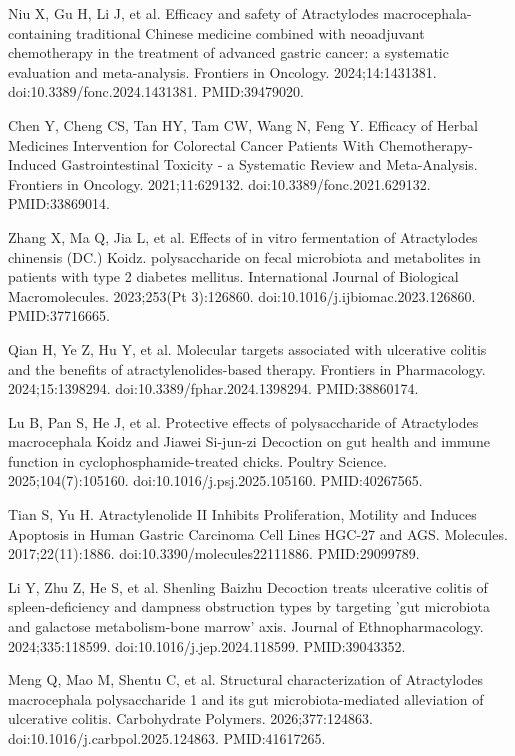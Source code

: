 \documentclass[12pt,oneside]{book}
\newcommand{\reff}[2]{\par\hangindent=7mm\hangafter=1\noindent[#1]\hspace{2mm}#2\par}
\begin{document}
\reff{39}{Niu X, Gu H, Li J, et al. Efficacy and safety of Atractylodes macrocephala-containing traditional Chinese medicine combined with neoadjuvant chemotherapy in the treatment of advanced gastric cancer: a systematic evaluation and meta-analysis. Frontiers in Oncology. 2024;14:1431381. doi:10.3389/fonc.2024.1431381. PMID:39479020.}

\reff{40}{Chen Y, Cheng CS, Tan HY, Tam CW, Wang N, Feng Y. Efficacy of Herbal Medicines Intervention for Colorectal Cancer Patients With Chemotherapy-Induced Gastrointestinal Toxicity - a Systematic Review and Meta-Analysis. Frontiers in Oncology. 2021;11:629132. doi:10.3389/fonc.2021.629132. PMID:33869014.}

\reff{41}{Zhang X, Ma Q, Jia L, et al. Effects of in vitro fermentation of Atractylodes chinensis (DC.) Koidz. polysaccharide on fecal microbiota and metabolites in patients with type 2 diabetes mellitus. International Journal of Biological Macromolecules. 2023;253(Pt 3):126860. doi:10.1016/j.ijbiomac.2023.126860. PMID:37716665.}

\reff{42}{Qian H, Ye Z, Hu Y, et al. Molecular targets associated with ulcerative colitis and the benefits of atractylenolides-based therapy. Frontiers in Pharmacology. 2024;15:1398294. doi:10.3389/fphar.2024.1398294. PMID:38860174.}

\reff{43}{Lu B, Pan S, He J, et al. Protective effects of polysaccharide of Atractylodes macrocephala Koidz and Jiawei Si-jun-zi Decoction on gut health and immune function in cyclophosphamide-treated chicks. Poultry Science. 2025;104(7):105160. doi:10.1016/j.psj.2025.105160. PMID:40267565.}

\reff{44}{Tian S, Yu H. Atractylenolide II Inhibits Proliferation, Motility and Induces Apoptosis in Human Gastric Carcinoma Cell Lines HGC-27 and AGS. Molecules. 2017;22(11):1886. doi:10.3390/molecules22111886. PMID:29099789.}

\reff{45}{Li Y, Zhu Z, He S, et al. Shenling Baizhu Decoction treats ulcerative colitis of spleen-deficiency and dampness obstruction types by targeting 'gut microbiota and galactose metabolism-bone marrow' axis. Journal of Ethnopharmacology. 2024;335:118599. doi:10.1016/j.jep.2024.118599. PMID:39043352.}

\reff{46}{Meng Q, Mao M, Shentu C, et al. Structural characterization of Atractylodes macrocephala polysaccharide 1 and its gut microbiota-mediated alleviation of ulcerative colitis. Carbohydrate Polymers. 2026;377:124863. doi:10.1016/j.carbpol.2025.124863. PMID:41617265.}
\end{document}
